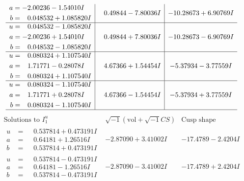\documentclass[1p]{elsarticle_modified}
\theoremstyle{definition}
\newcommand{\I}{\sqrt{-1}}
\begin{document}
$$\begin{array}{c|c|c}
\begin{aligned}
a &= -2.00236 - 1.54010 I \\
b &= \phantom{-}0.048532 + 1.085820 I\end{aligned}
 & \phantom{-}0.49844 - 7.80036 I & -10.28673 + 6.90769 I \\ \hline\begin{aligned}
u &= \phantom{-}0.048532 - 1.085820 I \\
a &= -2.00236 + 1.54010 I \\
b &= \phantom{-}0.048532 - 1.085820 I\end{aligned}
 & \phantom{-}0.49844 + 7.80036 I & -10.28673 - 6.90769 I \\ \hline\begin{aligned}
u &= \phantom{-}0.080324 + 1.107540 I \\
a &= \phantom{-}1.71771 - 0.28078 I \\
b &= \phantom{-}0.080324 + 1.107540 I\end{aligned}
 & \phantom{-}4.67366 + 1.54454 I & -5.37934 - 3.77559 I \\ \hline\begin{aligned}
u &= \phantom{-}0.080324 - 1.107540 I \\
a &= \phantom{-}1.71771 + 0.28078 I \\
b &= \phantom{-}0.080324 - 1.107540 I\end{aligned}
 & \phantom{-}4.67366 - 1.54454 I & -5.37934 + 3.77559 I\\
 \hline 
 \end{array}$$\newpage$$\begin{array}{c|c|c}  
\text{Solutions to }I^u_{1}& \I (\text{vol} + \sqrt{-1}CS) & \text{Cusp shape}\\
 \hline 
\begin{aligned}
u &= \phantom{-}0.537814 + 0.473191 I \\
a &= \phantom{-}0.64181 + 1.26516 I \\
b &= \phantom{-}0.537814 + 0.473191 I\end{aligned}
 & -2.87090 + 3.41002 I & -17.4789 - 2.4204 I \\ \hline\begin{aligned}
u &= \phantom{-}0.537814 - 0.473191 I \\
a &= \phantom{-}0.64181 - 1.26516 I \\
b &= \phantom{-}0.537814 - 0.473191 I\end{aligned}
 & -2.87090 - 3.41002 I & -17.4789 + 2.4204 I \\ \hline\begin{aligned}

\end{aligned}
\end{array}$$
\end{document}
